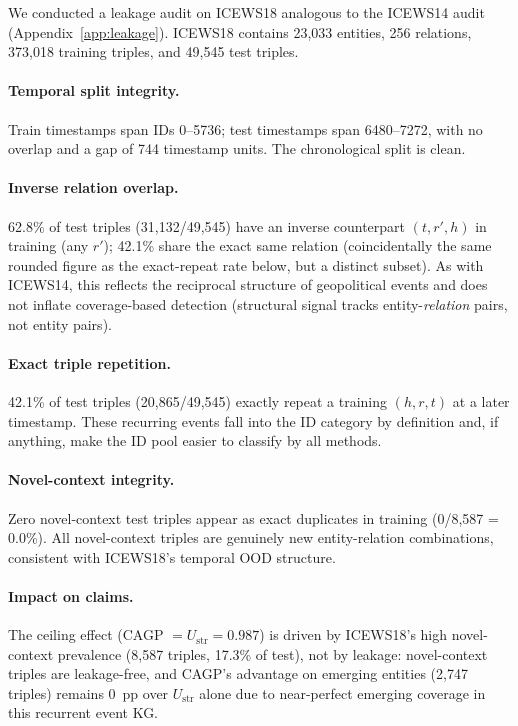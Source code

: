 \documentclass{article}
\begin{document}
We conducted a leakage audit on ICEWS18 analogous to the ICEWS14 audit (Appendix~\ref{app:leakage}). ICEWS18 contains 23,033 entities, 256 relations, 373,018 training triples, and 49,545 test triples.

\paragraph{Temporal split integrity.}
Train timestamps span IDs 0--5736; test timestamps span 6480--7272, with no overlap and a gap of 744 timestamp units. The chronological split is clean.

\paragraph{Inverse relation overlap.}
62.8\% of test triples (31,132/49,545) have an inverse counterpart $(t, r', h)$ in training (any $r'$); 42.1\% share the exact same relation (coincidentally the same rounded figure as the exact-repeat rate below, but a distinct subset). As with ICEWS14, this reflects the reciprocal structure of geopolitical events and does not inflate coverage-based detection (structural signal tracks entity-\emph{relation} pairs, not entity pairs).

\paragraph{Exact triple repetition.}
42.1\% of test triples (20,865/49,545) exactly repeat a training $(h,r,t)$ at a later timestamp. These recurring events fall into the ID category by definition and, if anything, make the ID pool easier to classify by all methods.

\paragraph{Novel-context integrity.}
Zero novel-context test triples appear as exact duplicates in training (0/8,587 = 0.0\%). All novel-context triples are genuinely new entity-relation combinations, consistent with ICEWS18's temporal OOD structure.

\paragraph{Impact on claims.}
The ceiling effect (CAGP $= U_{\text{str}} = 0.987$) is driven by ICEWS18's high novel-context prevalence (8,587 triples, 17.3\% of test), not by leakage: novel-context triples are leakage-free, and CAGP's advantage on emerging entities (2,747 triples) remains 0~pp over $U_{\text{str}}$ alone due to near-perfect emerging coverage in this recurrent event KG.
\end{document}
